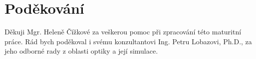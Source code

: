 \vspace*{\fill}

\chapter*{Poděkování}

Děkuji Mgr. Heleně Čížkové za veškerou pomoc při zpracování této maturitní práce. Rád bych poděkoval i svému konzultantovi Ing. Petru Lobazovi, Ph.D., za jeho odborné rady z oblasti optiky a její simulace.

\vspace*{1cm}
